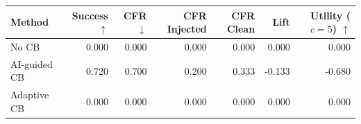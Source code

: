 \begin{tabular}{lrrrrrr}
\toprule
Method & Success $\uparrow$ & CFR $\downarrow$ & CFR Injected & CFR Clean & Lift & Utility ($c=5$) $\uparrow$ \\
\midrule
No CB & 0.000 & 0.000 & 0.000 & 0.000 & 0.000 & 0.000 \\
AI-guided CB & 0.720 & 0.700 & 0.200 & 0.333 & -0.133 & -0.680 \\
Adaptive CB & 0.000 & 0.000 & 0.000 & 0.000 & 0.000 & 0.000 \\
\bottomrule
\end{tabular}
